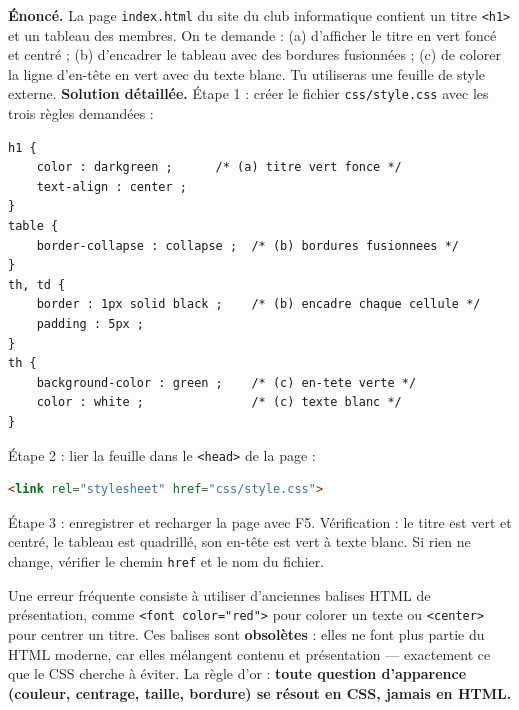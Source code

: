 \documentclass[11pt]{article}
\begin{document}
\begin{exoresolu}
\textbf{Énoncé.} La page \texttt{index.html} du site du club informatique contient un titre \texttt{<h1>} et un tableau des membres. On te demande : (a) d'afficher le titre en vert foncé et centré ; (b) d'encadrer le tableau avec des bordures fusionnées ; (c) de colorer la ligne d'en-tête en vert avec du texte blanc. Tu utiliseras une feuille de style externe.
\tcblower
\textbf{Solution détaillée.}
Étape 1 : créer le fichier \texttt{css/style.css} avec les trois règles demandées :
\begin{lstlisting}
h1 {
    color : darkgreen ;      /* (a) titre vert fonce */
    text-align : center ;
}
table {
    border-collapse : collapse ;  /* (b) bordures fusionnees */
}
th, td {
    border : 1px solid black ;    /* (b) encadre chaque cellule */
    padding : 5px ;
}
th {
    background-color : green ;    /* (c) en-tete verte */
    color : white ;               /* (c) texte blanc */
}
\end{lstlisting}
Étape 2 : lier la feuille dans le \texttt{<head>} de la page :
\begin{lstlisting}[language=HTML]
<link rel="stylesheet" href="css/style.css">
\end{lstlisting}
Étape 3 : enregistrer et recharger la page avec F5. Vérification : le titre est vert et centré, le tableau est quadrillé, son en-tête est vert à texte blanc. Si rien ne change, vérifier le chemin \texttt{href} et le nom du fichier.
\end{exoresolu}

\begin{attention}
Une erreur fréquente consiste à utiliser d'anciennes balises HTML de présentation, comme \texttt{<font color="red">} pour colorer un texte ou \texttt{<center>} pour centrer un titre. Ces balises sont \textbf{obsolètes} : elles ne font plus partie du HTML moderne, car elles mélangent contenu et présentation — exactement ce que le CSS cherche à éviter. La règle d'or : \textbf{toute question d'apparence (couleur, centrage, taille, bordure) se résout en CSS, jamais en HTML.}
\end{attention}
\end{document}
